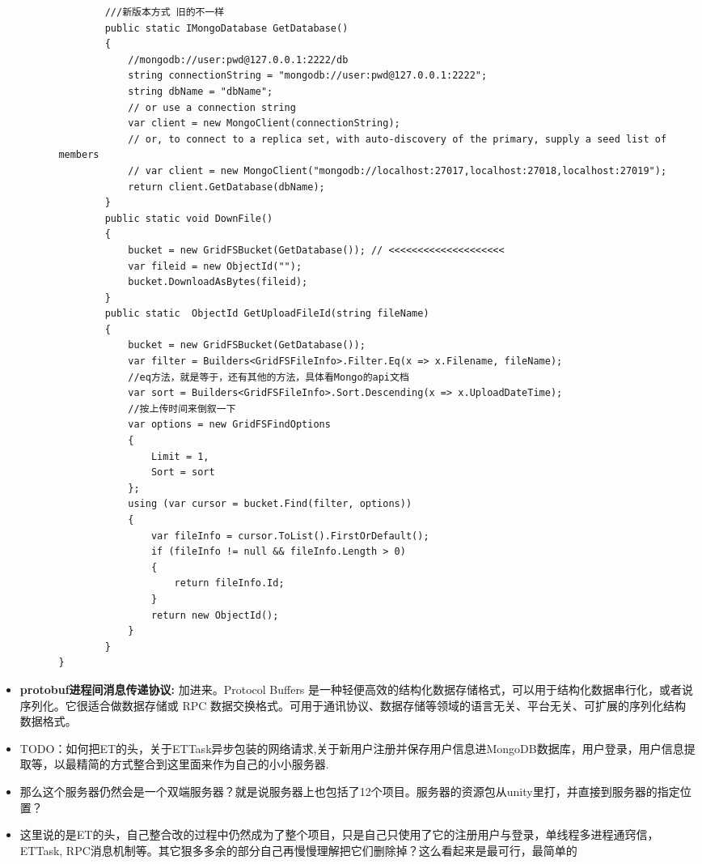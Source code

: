 \documentclass[9pt, b5paper]{article}
\begin{document}
\begin{itemize}
\begin{itemize}
\begin{itemize}
\begin{verbatim}
        ///新版本方式 旧的不一样
        public static IMongoDatabase GetDatabase()
        {
            //mongodb://user:pwd@127.0.0.1:2222/db
            string connectionString = "mongodb://user:pwd@127.0.0.1:2222";
            string dbName = "dbName";
            // or use a connection string
            var client = new MongoClient(connectionString);
            // or, to connect to a replica set, with auto-discovery of the primary, supply a seed list of members
            // var client = new MongoClient("mongodb://localhost:27017,localhost:27018,localhost:27019");
            return client.GetDatabase(dbName);
        }
        public static void DownFile()
        {
            bucket = new GridFSBucket(GetDatabase()); // <<<<<<<<<<<<<<<<<<<< 
            var fileid = new ObjectId("");
            bucket.DownloadAsBytes(fileid);
        }
        public static  ObjectId GetUploadFileId(string fileName)
        {
            bucket = new GridFSBucket(GetDatabase());
            var filter = Builders<GridFSFileInfo>.Filter.Eq(x => x.Filename, fileName);
            //eq方法，就是等于，还有其他的方法，具体看Mongo的api文档
            var sort = Builders<GridFSFileInfo>.Sort.Descending(x => x.UploadDateTime);
            //按上传时间来倒叙一下
            var options = new GridFSFindOptions
            {
                Limit = 1,
                Sort = sort
            };
            using (var cursor = bucket.Find(filter, options))
            {
                var fileInfo = cursor.ToList().FirstOrDefault();
                if (fileInfo != null && fileInfo.Length > 0)
                {
                    return fileInfo.Id;
                }
                return new ObjectId();
            }
        }
}
\end{verbatim}
\end{itemize}
\end{itemize}
\item \textbf{protobuf进程间消息传递协议:} 加进来。Protocol Buffers 是一种轻便高效的结构化数据存储格式，可以用于结构化数据串行化，或者说序列化。它很适合做数据存储或 RPC 数据交换格式。可用于通讯协议、数据存储等领域的语言无关、平台无关、可扩展的序列化结构数据格式。
\item TODO：如何把ET的头，关于ETTask异步包装的网络请求,关于新用户注册并保存用户信息进MongoDB数据库，用户登录，用户信息提取等，以最精简的方式整合到这里面来作为自己的小小服务器.
\item 那么这个服务器仍然会是一个双端服务器？就是说服务器上也包括了12个项目。服务器的资源包从unity里打，并直接到服务器的指定位置？
\item 这里说的是ET的头，自己整合改的过程中仍然成为了整个项目，只是自己只使用了它的注册用户与登录，单线程多进程通窍信，ETTask, RPC消息机制等。其它狠多多余的部分自己再慢慢理解把它们删除掉？这么看起来是最可行，最简单的

\end{itemize}
\end{document}
